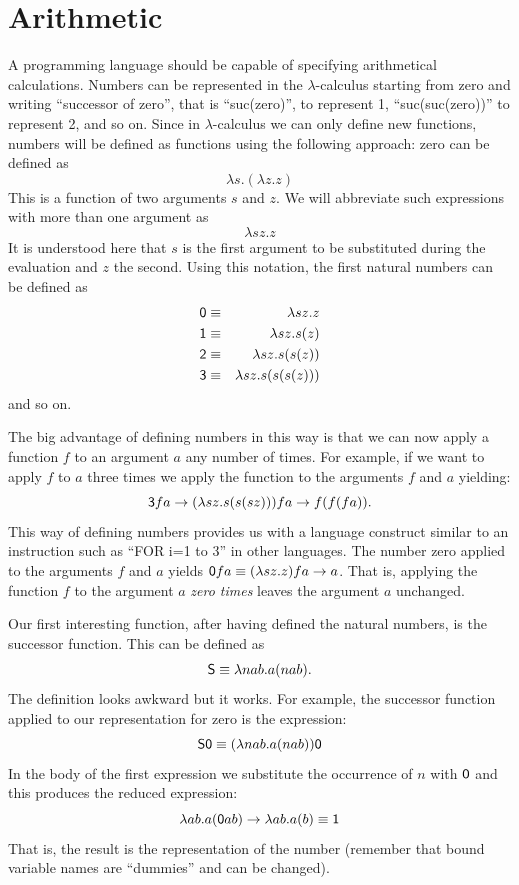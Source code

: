 \documentclass[12pt]{article}
\begin{document}
\section{Arithmetic}
A programming language should be capable of specifying arithmetical calculations. Numbers can be represented in the $\lambda$-calculus starting from zero and writing ``successor of zero'', that is ``suc(zero)'', to represent 1, ``suc(suc(zero))'' to represent 2, and so on. Since in $\lambda$-calculus we can only define new functions, numbers will be defined as functions using the following approach: zero can be defined as $$\lambda s.(\lambda z.z)$$ This is a function of two arguments $s$ and $z$. We will abbreviate such expressions with more than one argument as $$\lambda sz.z$$ It is understood here that $s$ is the first argument to be substituted during the evaluation and $z$ the second. Using this notation, the first natural numbers can be defined as 
\begin{eqnarray*}
{\sf 0} &\equiv& \lambda sz.z\\
{\sf 1} &\equiv& \lambda sz.s(z)\\
{\sf 2} &\equiv & \lambda s z.s(s(z))\\
{\sf 3} &\equiv&  \lambda s z.s (s(s(z)))
\end{eqnarray*}
and so on.

The big advantage of defining numbers in this way is that we can now apply a function $f$ to an argument $a$ any number of times. For example, if we want to apply $f$ to $a$ three times we apply the function {} to the arguments $f$ and $a$ yielding:
$$
{\sf 3}fa \rightarrow  (\lambda sz. s(s(sz)))fa \rightarrow f(f(fa)).
$$
This way of defining numbers provides us with a language construct similar to an instruction such as ``FOR i=1 to 3'' in other languages. The number zero applied to the arguments $f$ and $a$ yields ${\sf 0}fa \equiv (\lambda sz.z)fa \rightarrow a$. That is, applying the function $f$ to the argument $a$ {\em zero times} leaves the argument $a$ unchanged.

Our first interesting function, after having defined the natural numbers, is the successor function. This can be defined as 
$${\sf S}\equiv\lambda nab.a(nab).$$
The definition looks awkward but it works. For example, 
the successor function applied to our representation for zero is the expression:
$${\sf S0}\equiv (\lambda nab.a(nab)){\sf 0}$$ 
In the body of the first expression we substitute the occurrence of $n$ with ${\sf 0}$ and this produces the reduced expression:
$$\lambda ab.a({\sf 0}ab) \rightarrow \lambda ab.a(b)\equiv {\sf 1}$$
That is, the result is the representation of the number {}  (remember that bound variable names are ``dummies'' and can be changed). 
\end{document}
